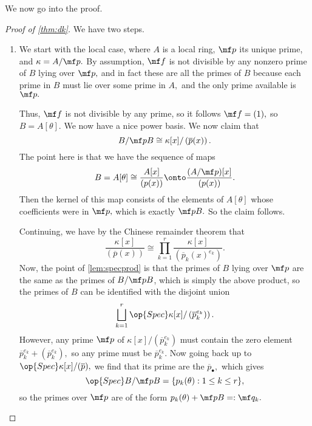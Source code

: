 We now go into the proof.
\begin{proof}[Proof of \autoref{thm:dk}]
	We have two steps.
	\begin{enumerate}
		\item We start with the local case, where $A$ is a local ring, $\mf p$ its unique prime, and $\kappa=A/\mf p.$ By assumption, $\mf f$ is not divisible by any nonzero prime of $B$ lying over $\mf p,$ and in fact these are all the primes of $B$ because each prime in $B$ must lie over some prime in $A,$ and the only prime available is $\mf p.$

		Thus, $\mf f$ is not divisible by any prime, so it follows $\mf f=(1),$ so $B=A[\theta].$ We now have a nice power basis. We now claim that
		\[B/\mf pB\cong\kappa[x]/\left(\overline p(x)\right).\]
		The point here is that we have the sequence of maps
		\[B=A[\theta]\cong\frac{A[x]}{(p(x))}\onto\frac{(A/\mf p)[x]}{(p(x))}.\]
		Then the kernel of this map consists of the elements of $A[\theta]$ whose coefficients were in $\mf p,$ which is exactly $\mf pB.$ So the claim follows.

		Continuing, we have by the Chinese remainder theorem that
		\[\frac{\kappa[x]}{(\overline p(x))}\cong\prod_{k=1}^r\frac{\kappa[x]}{\left(\overline p_k(x)^{e_k}\right)}.\]
		Now, the point of \autoref{lem:specprod} is that the primes of $B$ lying over $\mf p$ are the same as the primes of $B/\mf pB$, which is simply the above product, so the primes of $B$ can be identified with the disjoint union
		\[\bigsqcup_{k=1}^r\op{Spec}\kappa[x]/\left(\overline p_k^{e_k})\right).\]
		However, any prime $\mf p$ of $\kappa[x]/\left(\overline p_k^{e_k}\right)$ must contain the zero element $\overline p_k^{e_k}+\left(\overline p_k^{e_k}\right),$ so any prime must be $\overline p_k^{e_k}.$ Now going back up to $\op{Spec}\kappa[x]/(\overline p),$ we find that its prime are the $\overline p_\bullet,$ which gives
		\[\op{Spec}B/\mf pB=\{p_k(\theta):1\le k\le r\},\]
		so the primes over $\mf p$ are of the form $p_k(\theta)+\mf pB=:\mf q_k.$


\end{enumerate}
\end{proof}
